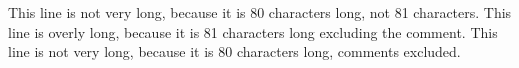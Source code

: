 This line is not very long, because it is 80 characters long, not 81 characters.
This line is overly long, because it is 81 characters long excluding the comment.  %
This line is not very long, because it is 80 characters long, comments excluded.  %
